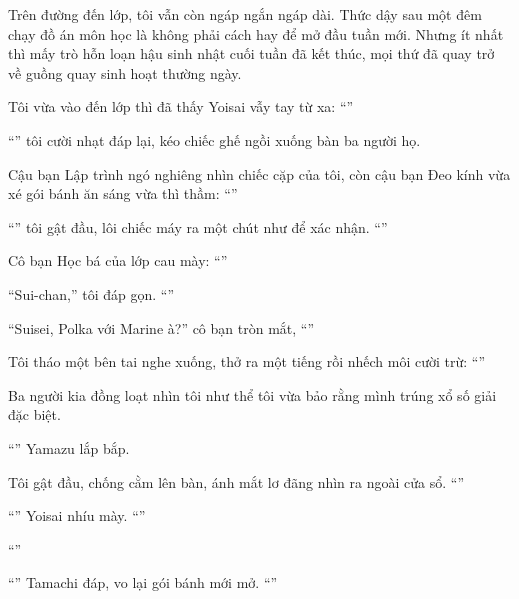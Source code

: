 \documentclass[../main.tex]{subfiles}
\begin{document}
Trên đường đến lớp, tôi vẫn còn ngáp ngắn ngáp dài. Thức dậy sau một đêm chạy đồ án môn học là không phải cách hay để mở đầu tuần mới. Nhưng ít nhất thì mấy trò hỗn loạn hậu sinh nhật cuối tuần đã kết thúc, mọi thứ đã quay trở về guồng quay sinh hoạt thường ngày.

Tôi vừa vào đến lớp thì đã thấy Yoisai vẫy tay từ xa: ``''

``'' tôi cười nhạt đáp lại, kéo chiếc ghế ngồi xuống bàn ba người họ.

Cậu bạn Lập trình ngó nghiêng nhìn chiếc cặp của tôi, còn cậu bạn Đeo kính vừa xé gói bánh ăn sáng vừa thì thầm: ``''

``'' tôi gật đầu, lôi chiếc máy ra một chút như để xác nhận. ``''

Cô bạn Học bá của lớp cau mày: ``''

``Sui-chan,'' tôi đáp gọn. ``''

``Suisei, Polka với Marine à?'' cô bạn tròn mắt, ``''

Tôi tháo một bên tai nghe xuống, thở ra một tiếng rồi nhếch môi cười trừ: ``''

Ba người kia đồng loạt nhìn tôi như thể tôi vừa bảo rằng mình trúng xổ số giải đặc biệt.

``'' Yamazu lắp bắp.

Tôi gật đầu, chống cằm lên bàn, ánh mắt lơ đãng nhìn ra ngoài cửa sổ. ``''

``'' Yoisai nhíu mày. ``''

``''

``'' Tamachi đáp, vo lại gói bánh mới mở. ``''
\end{document}
